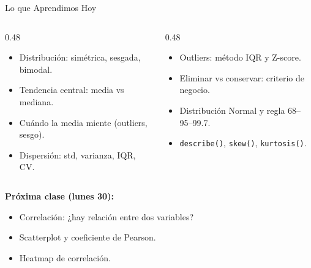 \documentclass[aspectratio=169, 11pt]{beamer}
\begin{document}
\begin{frame}{Lo que Aprendimos Hoy}
  \vspace{-4pt}
  \begin{columns}[T]
    \begin{column}{0.48\textwidth}
      {\footnotesize
      \begin{itemize}\setlength{\itemsep}{4pt}
        \item[{\color{codeGreen}\faCheckCircle}]
          Distribución: simétrica, sesgada, bimodal.
        \item[{\color{codeGreen}\faCheckCircle}]
          Tendencia central: media vs mediana.
        \item[{\color{codeGreen}\faCheckCircle}]
          Cuándo la media miente (outliers, sesgo).
        \item[{\color{codeGreen}\faCheckCircle}]
          Dispersión: std, varianza, IQR, CV.
      \end{itemize}
      }
    \end{column}

    \begin{column}{0.48\textwidth}
      {\footnotesize
      \begin{itemize}\setlength{\itemsep}{4pt}
        \item[{\color{codeGreen}\faCheckCircle}]
          Outliers: método IQR y Z-score.
        \item[{\color{codeGreen}\faCheckCircle}]
          Eliminar vs conservar: criterio de negocio.
        \item[{\color{codeGreen}\faCheckCircle}]
          Distribución Normal y regla 68--95--99.7.
        \item[{\color{codeGreen}\faCheckCircle}]
          \texttt{describe()}, \texttt{skew()}, \texttt{kurtosis()}.
      \end{itemize}
      }
    \end{column}
  \end{columns}

  \vspace{6pt}
  {\small\color{arcaDark}\bfseries Próxima clase (lunes 30):}
  \vspace{2pt}
  {\footnotesize
  \begin{itemize}\setlength{\itemsep}{2pt}
    \item[{\color{arcaRed}\faArrowRight}]
      Correlación: ¿hay relación entre dos variables?
    \item[{\color{arcaRed}\faArrowRight}]
      Scatterplot y coeficiente de Pearson.
    \item[{\color{arcaRed}\faArrowRight}]
      Heatmap de correlación.
  \end{itemize}
  }
\end{frame}
\end{document}
